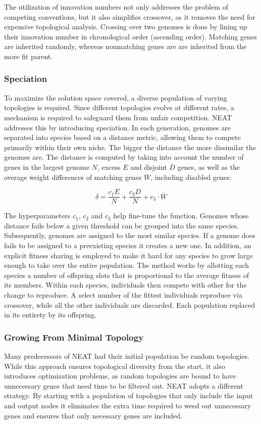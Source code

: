 \documentclass[letterpaper, 12pt]{article}
\begin{document}
The utilization of innovation numbers not only addresses the problem of competing
conventions, but it also simplifies crossover, as it removes the need for expensive
topological analysis. Crossing over two genomes is done by lining up their innovation
number in chronological order (ascending order). Matching genes are inherited randomly,
whereas nonmatching genes are are inherited from the more fit parent.

\subsubsection*{Speciation}
To maximize the solution space covered, a diverse population of varying topologies is
required. Since different topologies evolve at different rates, a mechanism is required
to safeguard them from unfair competition. NEAT addresses this by introducing
speciation. In each generation, genomes are separated into species based on a distance
metric, allowing them to compete primarily within their own niche. The bigger the
distance the more dissimilar the genomes are. The distance is computed by taking into
account the number of genes in the largest genome \(N\), excess \(E\) and disjoint \(D\)
genes, as well as the overage weight differences of matching genes \(\overline{W}\),
including disabled genes:

\[\delta=\frac{c_1E}{N}+\frac{c_2D}{N}+c_3 \cdot \overline{W}\]

The hyperparameters \(c_1\), \(c_2\) and \(c_3\) help fine-tune the function. Genomes
whose distance fails below a given threshold can be grouped into the same species.
Subsequently, genomes are assigned to the most similar species. If a genome does fails
to be assigned to a preexisting species it creates a new one. In addition, an explicit
fitness sharing \cite{goldbergarichardson} is employed to make it hard for any species
to grow large enough to take over the entire population. The method works by allotting
each species a number of offspring slots that is proportional to the average fitness of
its members. Within each species, individuals then compete with other for the change to
reproduce. A select number of the fittest individuals reproduce via crossover, while all
the other individuals are discarded. Each population replaced in its entirety by its
offspring.

\subsubsection*{Growing From Minimal Topology}
Many predecessors of NEAT had their initial population be random topologies. While this
approach ensures topological diversity from the start, it also introduces optimization
problems, as random topologies are bound to have unnecessary genes that need time to be
filtered out. NEAT adopts a different strategy. By starting with a population of
topologies that only include the input and output nodes it eliminates the extra time
required to weed out unnecessary genes and ensures that only necessary genes are
included.
\end{document}
